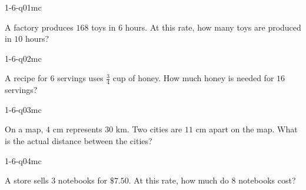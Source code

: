 

\begin{practiceQuestion}{1-6-q01}{mc}
\begin{questionText}
A factory produces $168$ toys in $6$ hours. At this rate, how many toys are produced in $10$ hours?
\end{questionText}
\end{practiceQuestion}

\begin{practiceQuestion}{1-6-q02}{mc}
\begin{questionText}
A recipe for $6$ servings uses $\frac{3}{4}$ cup of honey. How much honey is needed for $16$ servings?
\end{questionText}
\end{practiceQuestion}

\begin{practiceQuestion}{1-6-q03}{mc}
\begin{questionText}
On a map, $4$ cm represents $30$ km. Two cities are $11$ cm apart on the map. What is the actual distance between the cities?
\end{questionText}
\end{practiceQuestion}

\begin{practiceQuestion}{1-6-q04}{mc}
\begin{questionText}
A store sells $3$ notebooks for $\$7.50$. At this rate, how much do $8$ notebooks cost?
\end{questionText}
\end{practiceQuestion}

